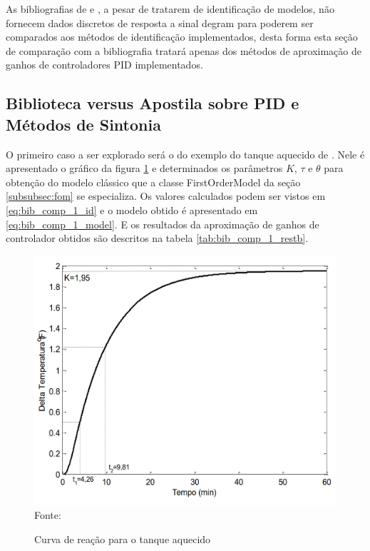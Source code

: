 As bibliografias de \cite{ogata2010engenharia} e \cite{CoelhoIdentificacao}, a pesar de tratarem de identificação de
modelos, não fornecem dados discretos de resposta a sinal degram para poderem ser comparados aos métodos de
identificação implementados, desta forma esta seção de comparação com a bibliografia tratará apenas dos métodos de
aproximação de ganhos de controladores PID implementados.

\subsection{Biblioteca versus Apostila sobre PID e Métodos de Sintonia}

O primeiro caso a ser explorado será o do exemplo do tanque aquecido de \cite{apostpidsint}.
Nele é apresentado o gráfico da figura \ref{fig:bib_comp_1_graph} e determinados os parâmetros $K$, $\tau$ e $\theta$ para
obtenção do modelo clássico que a classe FirstOrderModel da seção \ref{subsubsec:fom} se especializa.
Os valores calculados podem ser vistos em \ref{eq:bib_comp_1_id} e o modelo obtido é apresentado em
\ref{eq:bib_comp_1_model}.
E os resultados da aproximação de ganhos de controlador obtidos são descritos na tabela \ref{tab:bib_comp_1_restb}.


\begin{figure}[H]
    \centering
    \caption{Curva de reação para o tanque aquecido}
    \includegraphics[scale=0.4]{figuras/bib_comp_1_graph}
    \label{fig:bib_comp_1_graph}
    \\
    \vspace{0cm}\hspace{0cm}\small{Fonte: \cite{apostpidsint}}
\end{figure}

